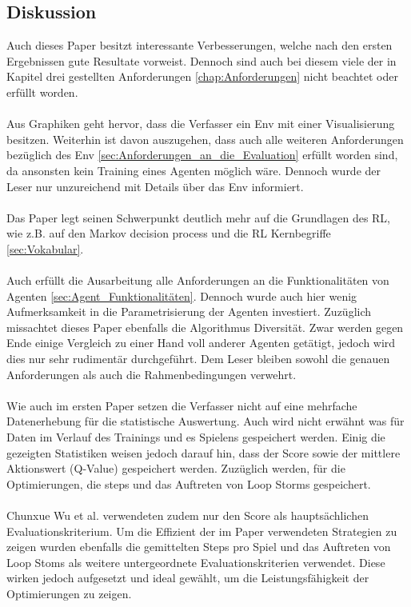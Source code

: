\subsection{Diskussion}\label{sec:Paper_2_Diskussion}
Auch dieses Paper besitzt interessante Verbesserungen, welche nach den ersten Ergebnissen gute Resultate vorweist. Dennoch sind auch bei diesem viele der in Kapitel drei gestellten Anforderungen \ref{chap:Anforderungen} nicht beachtet oder erfüllt worden.\\
\\Aus Graphiken geht hervor, dass die Verfasser ein Env mit einer Visualisierung besitzen. Weiterhin ist davon auszugehen, dass auch alle weiteren Anforderungen bezüglich des Env \ref{sec:Anforderungen_an_die_Evaluation} erfüllt worden sind, da ansonsten kein Training eines Agenten möglich wäre. Dennoch wurde der Leser nur unzureichend mit Details über das Env informiert.\\
\\Das Paper legt seinen Schwerpunkt deutlich mehr auf die Grundlagen des RL, wie z.B. auf den Markov decision process und die RL Kernbegriffe \ref{sec:Vokabular}.\\
\\Auch erfüllt die Ausarbeitung alle Anforderungen an die Funktionalitäten von Agenten \ref{sec:Agent_Funktionalitäten}. Dennoch wurde auch hier wenig Aufmerksamkeit in die Parametrisierung der Agenten investiert. Zuzüglich missachtet dieses Paper ebenfalls die Algorithmus Diversität. Zwar werden gegen Ende einige Vergleich zu einer Hand voll anderer Agenten getätigt, jedoch wird dies nur sehr rudimentär durchgeführt. Dem Leser bleiben sowohl die genauen Anforderungen als auch die Rahmenbedingungen verwehrt.\\
\\Wie auch im ersten Paper setzen die Verfasser nicht auf eine mehrfache Datenerhebung für die statistische Auswertung. Auch wird nicht erwähnt was für Daten im Verlauf des Trainings und es Spielens gespeichert werden. Einig die gezeigten Statistiken weisen jedoch darauf hin, dass der Score sowie der mittlere Aktionswert (Q-Value) gespeichert werden. Zuzüglich werden, für die Optimierungen, die steps und das Auftreten von Loop Storms gespeichert.\\
\\ Chunxue Wu et al. verwendeten zudem nur den Score als hauptsächlichen Evaluationskriterium. Um die Effizient der im Paper verwendeten Strategien zu zeigen wurden ebenfalls die gemittelten Steps pro Spiel und das Auftreten von Loop Stoms als weitere untergeordnete Evaluationskriterien verwendet. Diese wirken jedoch aufgesetzt und ideal gewählt, um die Leistungsfähigkeit der Optimierungen zu zeigen.

